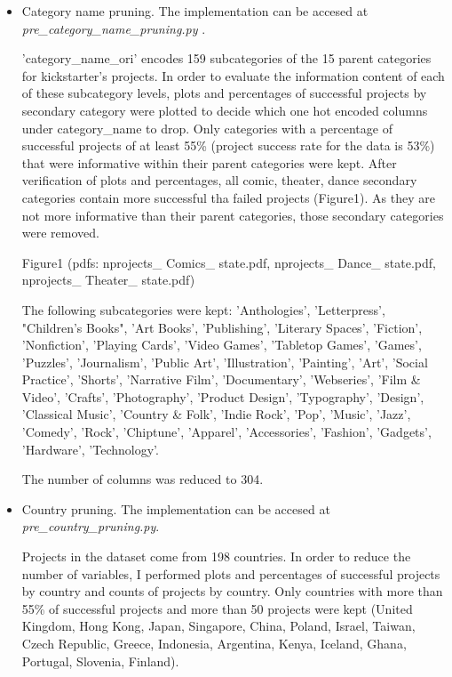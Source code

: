 \documentclass{article}
\begin{document}
{\begin{itemize}
\begin{itemize}
	\item Category name pruning.
	The implementation can be accesed at \emph{pre\_category\_name\_pruning.py }.
	
	'category\_name\_ori' encodes 159 subcategories of the 15 parent categories for kickstarter's projects. In order to evaluate the information content of each of these subcategory levels, plots and percentages of successful projects by secondary category were plotted to decide which one hot encoded columns under category\_name to drop. Only categories with a percentage of successful projects of at least 55\% (project success rate for the data is 53\%) that were informative within their parent categories were kept.
	After verification of plots and percentages, all comic, theater, dance secondary categories contain more successful tha failed projects (Figure1). As they are not more informative than their parent categories, those secondary categories were removed. 
	
	Figure1 (pdfs: nprojects\_ Comics\_ state.pdf, nprojects\_ Dance\_ state.pdf, nprojects\_ Theater\_ state.pdf)
	
	The following subcategories were kept: 'Anthologies', 'Letterpress', "Children's Books", 'Art Books', 'Publishing', 'Literary Spaces', 'Fiction', 'Nonfiction', 'Playing Cards', 'Video Games', 'Tabletop Games', 'Games', 'Puzzles', 'Journalism', 'Public Art', 'Illustration', 'Painting', 'Art', 'Social Practice', 'Shorts', 'Narrative Film', 'Documentary', 'Webseries', 'Film \& Video', 'Crafts', 'Photography', 'Product Design', 'Typography', 'Design', 'Classical Music', 'Country \& Folk', 'Indie Rock', 'Pop', 'Music', 'Jazz', 'Comedy', 'Rock', 'Chiptune', 'Apparel', 'Accessories', 'Fashion', 'Gadgets', 'Hardware', 'Technology'.
	
	The number of columns was reduced to 304.
	
        \item Country pruning.
        The implementation can be accesed at \emph{pre\_country\_pruning.py}.  
	
	Projects in the dataset come from 198 countries. In order to reduce the number of variables, I performed plots and percentages of successful projects by country and counts of projects by country. Only countries with more than 55\% of successful projects and more than 50 projects were kept (United Kingdom, Hong Kong, Japan, Singapore, China, Poland, Israel, Taiwan, Czech Republic, Greece, Indonesia, Argentina, Kenya, Iceland, Ghana, Portugal, Slovenia, Finland).
	

\end{itemize}
\end{itemize}}
\end{document}
